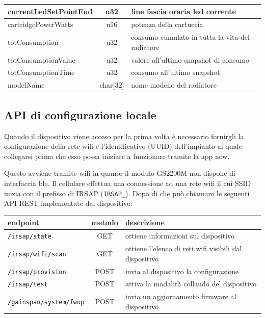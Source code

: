 \documentclass[12pt,a4paper,twoside,titlepage]{book}
\begin{document}
\begin{center}
\begin{longtable}{| p{5cm} | c | p{8cm} |}
    currentLedSetPointEnd & u32 & fine fascia oraria \acrshort{led} corrente\\ \hline
    cartridgePowerWatts & u16 & potenza della cartuccia\\ \hline
    totConsumption & u32 & consumo cumulato in tutta la vita del radiatore\\ \hline
    totConsumptionValue & u32 & valore all’ultimo snapshot di consumo\\ \hline
    totConsumptionTime & u32 & consumo all’ultimo snapshot\\ \hline
    modelName & char[32] & nome modello del radiatore\\ \hline
\end{longtable}
\end{center}

\subsection{API di configurazione locale}

Quando il dispositivo viene acceso per la prima volta è necessario fornirgli la
configurazione della rete \Gls{wifi} e l'identificativo (UUID) dell'impianto al quale
collegarsi prima che esso possa iniziare a funzionare tramite la app \Gls{now}.

Questo avviene tramite \Gls{wifi} in quanto il modulo GS2200M non dispone di interfaccia 
\acrshort{ble}. Il cellulare effettua una connessione ad una rete \Gls{wifi} il cui 
SSID inizia con il prefisso di IRSAP (\texttt{IRSAP\_}). Dopo di che può chiamare 
le seguenti API REST implementate dal dispositivo:

\begin{center}
\begin{tabular}{| l | c | p{6cm} |}
    \hline 
    \textbf{endpoint} & \textbf{metodo} & \textbf{descrizione} \\ \hline 
    \texttt{/irsap/state} & GET & ottiene informazioni sul dispositivo \\ \hline 
    \texttt{/irsap/wifi/scan} & GET & ottiene l'elenco di reti \Gls{wifi} visibili dal dispositivo \\ \hline 
    \texttt{/irsap/provision} & POST & invia al dispositivo la configurazione \\ \hline 
    \texttt{/irsap/test} & POST & attiva la modalità collaudo del dispositivo \\ \hline 
    \texttt{/gainspan/system/fwup} & POST & invia un aggiornamento \gls{firmware} al dispositivo \\ \hline
\end{tabular}
\end{center}
\end{document}
